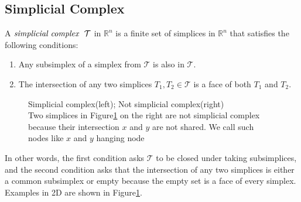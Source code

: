 \subsection{Simplicial Complex}
    \begin{definition*}
    A $\emph{simplicial complex} ~~\mathcal T$ in $\mathbb{R}^n$ is a finite set of simplices in $\mathbb{R}^n$ that satisfies the following conditions:
    \begin{enumerate}[label =\arabic*.]
      \item Any subsimplex of a simplex from $\mathcal{T}$ is also in $\mathcal{T}$.
      \item The intersection of any two simplices ${T}_1, {T}_2 \in \mathcal{T}$ is a face of both ${T}_1$ and  ${T}_2$.
    \end{enumerate}
    \begin{figure}[b]
    \centering
    \caption{Simplicial complex(left); Not simplicial complex(right)\\Two simplices in Figure\ref{Fig2} on the right are not simplicial complex because their intersection $x$ and $y$ are not shared. We call such nodes like $x$ and $y$ hanging node}%
    \label{Fig2}
    \end{figure}
    \end{definition*}
    In other words, the first condition asks $\mathcal{T}$ to be closed under taking subsimplices, and the second condition asks that the intersection of any two simplices is either a common subsimplex or empty because the empty set is a face of every simplex. Examples in 2D are shown in Figure\ref{Fig2}. 

